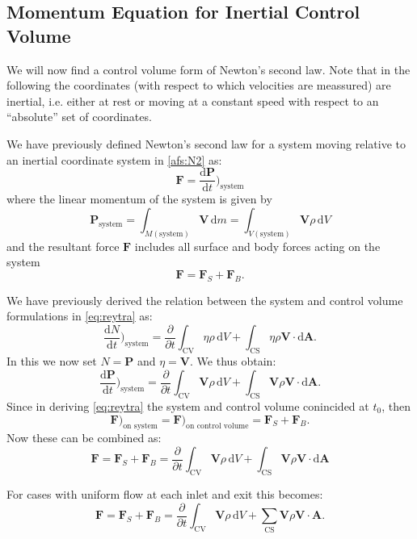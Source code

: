 
\subsection{Momentum Equation for Inertial Control Volume}
We will now find a control volume form of Newton's second law. Note that in the following the coordinates (with respect to which velocities are meassured) are inertial, i.e. either at rest or moving at a constant speed with respect to an ``absolute'' set of coordinates.

We have previously defined Newton's second law for a system moving relative to an inertial coordinate system in \autoref{afs:N2} as:
\[ 
\textbf{F} = \frac{\mathrm{d}\textbf{P}}{\mathrm{d}t} \bigg)_{\mathrm{system}}
\]
where the linear momentum of the system is given by
\[ 
\textbf{P}_{\mathrm{system}} = \int_{M \left( \mathrm{system} \right)} \textbf{V} \, \mathrm{d}m = \int_{V (\mathrm{system})} \textbf{V} \rho \, \mathrm{d}V
\]
and the resultant force $\textbf{F}$ includes all surface and body forces acting on the system
\[ 
\textbf{F} = \textbf{F}_S + \textbf{F}_B
.\]

We have previously derived the relation between the system and control volume formulations in \autoref{eq:reytra} as:
\[ 
\frac{\mathrm{d}N}{\mathrm{d}t} \bigg)_{\mathrm{system}} = \frac{\partial }{\partial t} \int_{\mathrm{CV}} \eta \rho \, \mathrm{d}V + \int_{\mathrm{CS}} \eta \rho \textbf{V} \cdot \mathrm{d}\textbf{A}
.\]
In this we now set $N = \textbf{P}$ and $\eta = \textbf{V}$. We thus obtain:
\[ 
\frac{\mathrm{d}\textbf{P}}{\mathrm{d}t} \bigg)_{\mathrm{system}} = \frac{\partial }{\partial t} \int_{\mathrm{CV}} \textbf{V} \rho \, \mathrm{d}V + \int_{\mathrm{CS}} \textbf{V} \rho \textbf{V} \cdot \mathrm{d} \textbf{A}
.\]
Since in deriving \autoref{eq:reytra} the system and control volume conincided at $t_0$, then
\[ 
\textbf{F})_{\text{on system}} = \textbf{F})_{\text{on control volume}} = \textbf{F}_S + \textbf{F}_B
.\]
Now these can be combined as:
\begin{equation}\label{eq:convolN2}
  \textbf{F} = \textbf{F}_S + \textbf{F}_B = \frac{\partial}{\partial t} \int_{\mathrm{CV}} \textbf{V} \rho \, \mathrm{d}V + \int_{\mathrm{CS}} \textbf{V}\rho \textbf{V} \cdot \mathrm{d}\textbf{A} 
\end{equation}

For cases with uniform flow at each inlet and exit this becomes:
\[ 
\textbf{F} = \textbf{F}_S + \textbf{F}_B = \frac{\partial }{\partial t} \int_{\mathrm{CV}} \textbf{V} \rho \, \mathrm{d}V + \sum_{\mathrm{CS}} \textbf{V} \rho \textbf{V} \cdot \textbf{A}
.\]

